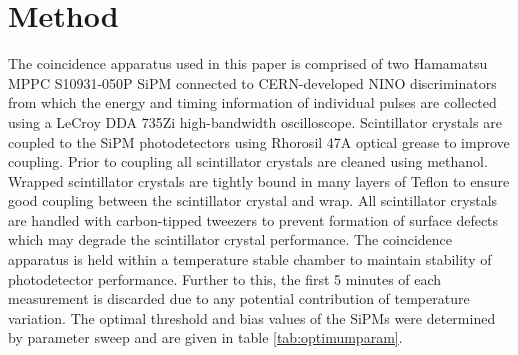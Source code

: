 \section{Method}
The coincidence apparatus used in this paper is comprised of two Hamamatsu MPPC S10931-050P SiPM connected to CERN-developed NINO discriminators from which the energy and timing information of individual pulses are collected using a LeCroy DDA 735Zi high-bandwidth oscilloscope. Scintillator crystals are coupled to the SiPM photodetectors using Rhorosil 47A optical grease to improve coupling. Prior to coupling all scintillator crystals are cleaned using methanol. Wrapped scintillator crystals are tightly bound in many layers of Teflon to ensure good coupling between the scintillator crystal and wrap. All scintillator crystals are handled with carbon-tipped tweezers to prevent formation of surface defects which may degrade the scintillator crystal performance. The coincidence apparatus is held within a temperature stable chamber to maintain stability of photodetector performance. Further to this, the first 5 minutes of each measurement is discarded due to any potential contribution of temperature variation. The optimal threshold and bias values of the SiPMs were determined by parameter sweep and are given in table \ref{tab:optimumparam}.
